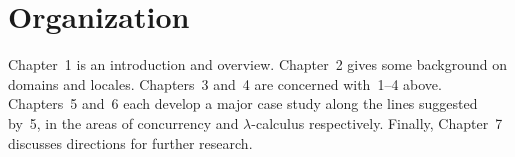 \section*{Organization}
Chapter~1 is an introduction and overview.
Chapter~2 gives some background on domains and locales.
Chapters~3 and~4 are concerned with~1--4 above.
Chapters~5 and~6 each develop a major case study along the lines suggested by~5, in the areas of concurrency and $\lambda$-calculus respectively.
Finally, Chapter~7  discusses directions for further research.
